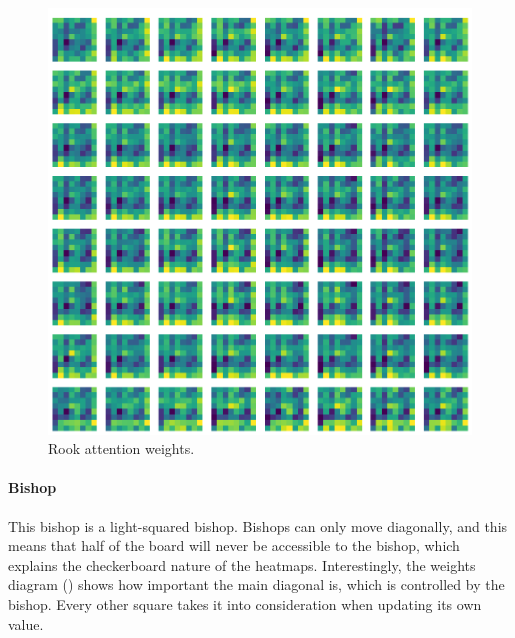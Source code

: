 \begin{figure}[H]
\begin{minipage}{0.475\textwidth}
    \includegraphics[width=\textwidth]{project/img/attention_maps/R_weights_1.png}
    \caption{Rook attention weights.}
    \label{atnR}
  \end{minipage}
\end{figure}

\newpage

\paragraph{Bishop} This bishop is a light-squared bishop. Bishops can only move
diagonally, and this means that half of the board will never be accessible to
the bishop, which explains the checkerboard nature of the heatmaps.
Interestingly, the weights diagram () shows how important the main
diagonal is, which is controlled by the bishop. Every other square takes it
into consideration when updating its own value.

